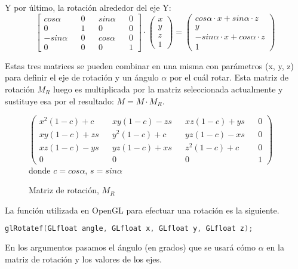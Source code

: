 Y por último, la rotación alrededor del eje Y:
\begin{equation*}
  \begin{bmatrix}
    cos \alpha && 0 && sin \alpha && 0 \\
    0 && 1 && 0 && 0 \\
    - sin \alpha && 0 && cos \alpha && 0 \\
    0 && 0 && 0 && 1
  \end{bmatrix}
  \cdot
  \begin{pmatrix}
    x \\ y \\ z \\ 1
  \end{pmatrix}
  =
  \begin{pmatrix}
    cos \alpha \cdot x + sin \alpha \cdot z \\
    y \\
    - sin \alpha \cdot x + cos \alpha \cdot z \\
    1
  \end{pmatrix}
\end{equation*}


Estas tres matrices se pueden combinar en una misma con parámetros (x, y, z) para definir el eje de rotación y un ángulo $\alpha$ por el cuál rotar. Esta matriz de rotación $M_R$ luego es multiplicada por la matriz seleccionada actualmente y sustituye esa por el resultado: $M = M \cdot M_R$.
\begin{figure} [ht]
  \centering
  \(
  \begin{pmatrix}
    x^2(1-c) + c  && xy(1-c) - zs && xz(1-c) + ys && 0\\
    xy(1-c) + zs && y^2(1-c) + c  && yz(1-c) - xs && 0\\
    xz(1-c) - ys && yz(1-c) + xs && z^2(1-c) + c  && 0\\
    0 && 0 && 0 && 1
  \end{pmatrix}
  \)
  \\donde $c = cos \alpha$, $s = sin \alpha$ 
  \caption{Matriz de rotación, $M_R$}
\end{figure}

La función utilizada en OpenGL para efectuar una rotación es la siguiente.
\begin{lstlisting}[language=C]
  glRotatef(GLfloat angle, GLfloat x, GLfloat y, GLfloat z);
\end{lstlisting}
En los argumentos pasamos el ángulo (en grados) que se usará cómo $\alpha$ en la matriz de rotación y los valores de los ejes.

